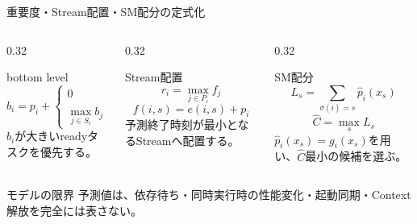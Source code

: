 \documentclass[aspectratio=169,10pt]{beamer}
\begin{document}
\begin{frame}{重要度・Stream配置・SM配分の定式化}
  \small
  \begin{columns}[T,onlytextwidth]
    \begin{column}{0.32\textwidth}
      \begin{block}{bottom level}
        \[
        b_i = p_i +
        \begin{cases}
          0 & (S_i=\emptyset)\\
          \max_{j\in S_i} b_j & (\text{otherwise})
        \end{cases}
        \]
        $b_i$が大きいreadyタスクを優先する。
      \end{block}
    \end{column}
    \begin{column}{0.32\textwidth}
      \begin{block}{Stream配置}
        \[
          r_i=\max_{j\in P_i} f_j
        \]
        \[
          f(i,s)=e(i,s)+p_i
        \]
        予測終了時刻が最小となるStreamへ配置する。
      \end{block}
    \end{column}
    \begin{column}{0.32\textwidth}
      \begin{block}{SM配分}
        \[
          L_s=\sum_{\sigma(i)=s}\hat p_i(x_s)
        \]
        \[
          \hat C=\max_s L_s
        \]
        $\hat p_i(x_s)=g_i(x_s)$を用い、$\hat C$最小の候補を選ぶ。
      \end{block}
    \end{column}
  \end{columns}
  \begin{alertblock}{モデルの限界}
    予測値は、依存待ち・同時実行時の性能変化・起動同期・Context解放を完全には表さない。
  \end{alertblock}
\end{frame}
\end{document}
